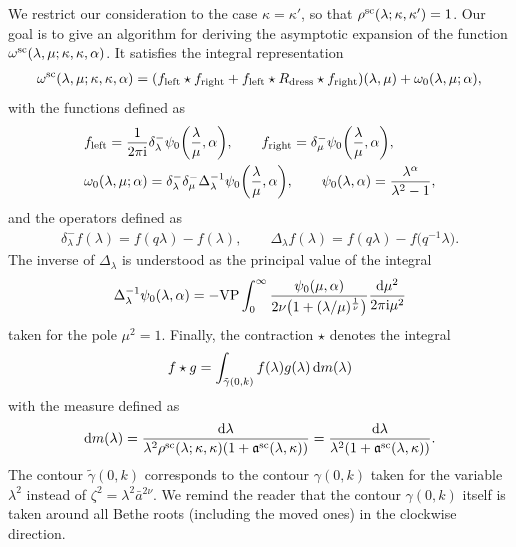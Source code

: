 \documentclass[pdftex]{sigma}
\numberwithin{equation}{section}
\begin{document}
We restrict our consideration to the case $\kappa=\kappa'$, so that $\rho^{{\rm sc}}(\lambda; \kappa, \kappa')=1$. Our goal is to give an algorithm for deriving the asymptotic expansion of the function $\omega^{{\rm sc}}(\lambda, \mu; \kappa, \kappa, \alpha)$. It satisfies the integral representation~\cite{BG_2009}
\begin{align}\label{2_omega}
\omega^{{\rm sc}}(\lambda, \mu; \kappa, \kappa, \alpha)=(f_{{\rm left}}\star f_{{\rm right}}+f_{{\rm left}}\star R_{{\rm dress}}\star f_{{\rm right}})(\lambda, \mu)+\omega_0(\lambda, \mu; \alpha),
\end{align}
with the functions defined as
\begin{align*}
&f_{{\rm left}}=\frac{1}{2\pi {\rm i}}\delta_\lambda^{-}\psi_0\biggl(\frac{\lambda}{\mu}, \alpha\biggr),\qquad
f_{{\rm right}}=                \delta_\mu^{-}    \psi_0\biggl(\frac{\lambda}{\mu}, \alpha\biggr),\\
&\omega_0(\lambda, \mu; \alpha)=  \delta_\lambda^{-}\delta_\mu^{-}\Delta_\lambda^{-1}\psi_0\biggl(\frac{\lambda}{\mu}, \alpha\biggr), \qquad
\psi_0(\lambda, \alpha)=\frac{\lambda^\alpha}{\lambda^2-1},
\end{align*}
and the operators defined as
\begin{align*}
\delta_\lambda^{-}f(\lambda)=f(q\lambda)-f(\lambda),\qquad
\Delta_\lambda f(\lambda)=f(q\lambda)-f\bigl(q^{-1}\lambda\bigr).
\end{align*}
The inverse of $\Delta_\lambda$ is understood as the principal value of the integral
\begin{align*}
\Delta^{-1}_\lambda \psi_0(\lambda, \alpha)=-\text{VP} \int_0^{\infty} \frac{\psi_0(\mu, \alpha)}{2\nu\bigl(1+(\lambda/\mu)^\frac{1}{\nu}\bigr)} \frac{{\rm d}\mu^2}{2\pi {\rm i}\mu^2}
\end{align*}
taken for the pole $\mu^2=1$. Finally, the contraction $\star$ denotes the integral
\begin{align*}
f \star g = \int_{\tilde{\gamma}(0, k)} f(\lambda) g(\lambda)\, {\rm d}m(\lambda)
\end{align*}
with the measure defined as
\begin{align*}
{\rm d}m(\lambda)=\frac{{\rm d}\lambda}{\lambda^2 \rho^{{\rm sc}} (\lambda; \kappa, \kappa) (1+\mathfrak{a}^{{\rm sc}}(\lambda, \kappa))}
           =\frac{{\rm d}\lambda}{\lambda^2 (1+\mathfrak{a}^{{\rm sc}}(\lambda, \kappa))}.
\end{align*}
The contour $\tilde{\gamma}(0, k)$ corresponds to the contour $\gamma(0, k)$ taken for the variable $\lambda^2$ instead of ${\zeta^2=\lambda^2 \bar{a}^{2\nu}}$. We remind the reader that the contour $\gamma(0, k)$ itself is taken around all Bethe roots (including the moved ones) in the clockwise direction.
\end{document}
